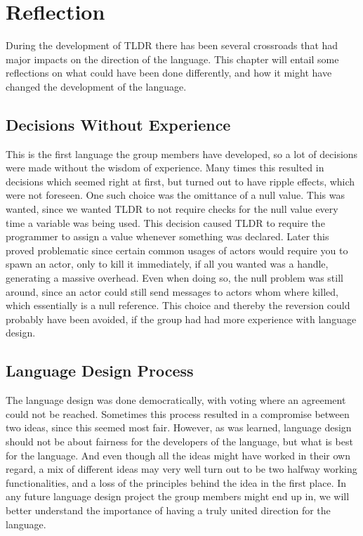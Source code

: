 \chapter{Reflection}\label{chapter:reflection}

During the development of TLDR there has been several crossroads that had major impacts on the direction of the language. This chapter will entail some reflections on what could have been done differently, and how it might have changed the development of the language.

\section{Decisions Without Experience}

This is the first language the group members have developed, so a lot of decisions were made without the wisdom of experience. Many times this resulted in decisions which seemed right at first, but turned out to have ripple effects, which were not foreseen. One such choice was the omittance of a null value. This was wanted, since we wanted TLDR to not require checks for the null value every time a variable was being used. This decision caused TLDR to require the programmer to assign a value whenever something was declared. Later this proved problematic since certain common usages of actors would require you to spawn an actor, only to kill it immediately, if all you wanted was a handle, generating a massive overhead. Even when doing so, the null problem was still around, since an actor could still send messages to actors whom where killed, which essentially is a null reference. This choice and thereby the reversion could probably have been avoided, if the group had had more experience with language design.

\section{Language Design Process}

The language design was done democratically, with voting where an agreement could not be reached. Sometimes this process resulted in a compromise between two ideas, since this seemed most fair. However, as was learned, language design should not be about fairness for the developers of the language, but what is best for the language. And even though all the ideas might have worked in their own regard, a mix of different ideas may very well turn out to be two halfway working functionalities, and a loss of the principles behind the idea in the first place. In any future language design project the group members might end up in, we will better understand the importance of having a truly united direction for the language.

